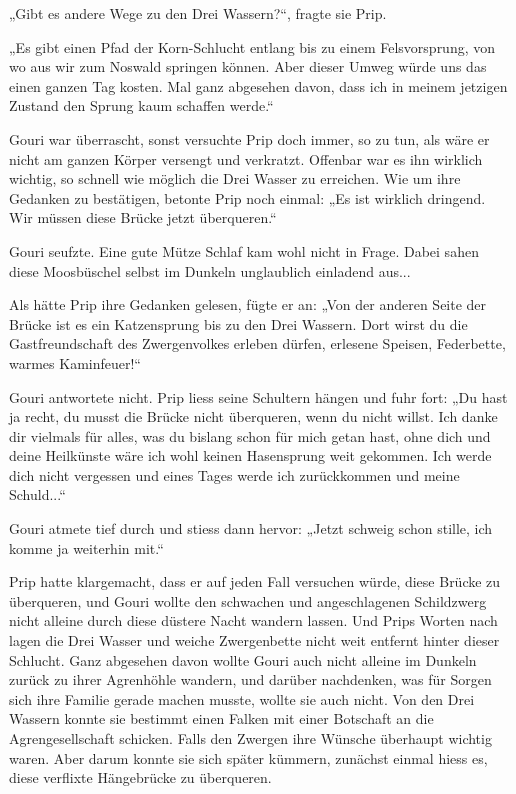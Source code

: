 \documentclass[10pt, a4paper, oneside]{book}
\begin{document}
„Gibt es andere Wege zu den Drei Wassern?“, fragte sie Prip.

„Es gibt einen Pfad der Korn-Schlucht entlang bis zu einem Felsvorsprung, von wo aus wir zum Noswald springen können. Aber dieser Umweg würde uns das einen ganzen Tag kosten. Mal ganz abgesehen davon, dass ich in meinem jetzigen Zustand den Sprung kaum schaffen werde.“

Gouri war überrascht, sonst versuchte Prip doch immer, so zu tun, als wäre er nicht am ganzen Körper versengt und verkratzt. Offenbar war es ihn wirklich wichtig, so schnell wie möglich die Drei Wasser zu erreichen. Wie um ihre Gedanken zu bestätigen, betonte Prip noch einmal: „Es ist wirklich dringend. Wir müssen diese Brücke jetzt überqueren.“

Gouri seufzte. Eine gute Mütze Schlaf kam wohl nicht in Frage. Dabei sahen diese Moosbüschel selbst im Dunkeln unglaublich einladend aus...

Als hätte Prip ihre Gedanken gelesen, fügte er an: „Von der anderen Seite der Brücke ist es ein Katzensprung bis zu den Drei Wassern. Dort wirst du die Gastfreundschaft des Zwergenvolkes erleben dürfen, erlesene Speisen, Federbette, warmes Kaminfeuer!“

Gouri antwortete nicht. Prip liess seine Schultern hängen und fuhr fort: „Du hast ja recht, du musst die Brücke nicht überqueren, wenn du nicht willst. Ich danke dir vielmals für alles, was du bislang schon für mich getan hast, ohne dich und deine Heilkünste wäre ich wohl keinen Hasensprung weit gekommen. Ich werde dich nicht vergessen und eines Tages werde ich zurückkommen und meine Schuld...“

Gouri atmete tief durch und stiess dann hervor: „Jetzt schweig schon stille, ich komme ja weiterhin mit.“

Prip hatte klargemacht, dass er auf jeden Fall versuchen würde, diese Brücke zu überqueren, und Gouri wollte den schwachen und angeschlagenen Schildzwerg nicht alleine durch diese düstere Nacht wandern lassen. Und Prips Worten nach lagen die Drei Wasser und weiche Zwergenbette nicht weit entfernt hinter dieser Schlucht. Ganz abgesehen davon wollte Gouri auch nicht alleine im Dunkeln zurück zu ihrer Agrenhöhle wandern, und darüber nachdenken, was für Sorgen sich ihre Familie gerade machen musste, wollte sie auch nicht. Von den Drei Wassern konnte sie bestimmt einen Falken mit einer Botschaft an die Agrengesellschaft schicken. Falls den Zwergen ihre Wünsche überhaupt wichtig waren. Aber darum konnte sie sich später kümmern, zunächst einmal hiess es, diese verflixte Hängebrücke zu überqueren.
\end{document}
